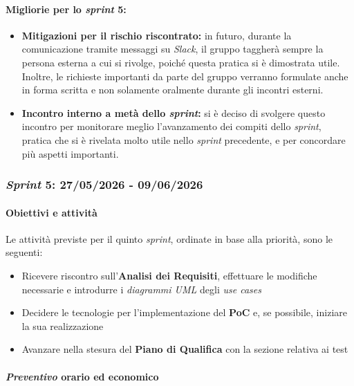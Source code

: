 \documentclass[12pt, a4paper]{article}
\begin{document}
{\paragraph{Migliorie per lo \textit{sprint} 5:}
\begin{itemize}
    \item \textbf{Mitigazioni per il rischio riscontrato:} in futuro, durante la comunicazione tramite messaggi su \textit{Slack}, il gruppo taggherà sempre la persona esterna a cui si rivolge, poiché questa pratica si è dimostrata utile. Inoltre, le richieste importanti da parte del gruppo verranno formulate anche in forma scritta e non solamente oralmente durante gli incontri esterni.
    \item \textbf{Incontro interno a metà dello \textit{sprint}:} 
    si è deciso di svolgere questo incontro per monitorare meglio l'avanzamento dei compiti dello \textit{sprint}, pratica che si è rivelata molto utile nello \textit{sprint} precedente, e per concordare più aspetti importanti.
\end{itemize}


\subsubsection{\textit{Sprint} 5: 27/05/2026 - 09/06/2026}

\paragraph{Obiettivi e attività}

Le attività previste per il quinto \textit{sprint}, ordinate in base alla priorità, sono le seguenti:

\begin{itemize}
    \item Ricevere riscontro sull'\textbf{Analisi dei Requisiti}, effettuare le modifiche necessarie e introdurre i \textit{diagrammi UML} degli \textit{use cases}
    \item Decidere le tecnologie per l'implementazione del \textbf{PoC} e, se possibile, iniziare la sua realizzazione
    \item Avanzare nella stesura del \textbf{Piano di Qualifica} con la sezione relativa ai test
\end{itemize}

\paragraph{\textit{Preventivo} orario ed economico}

}
\end{document}
